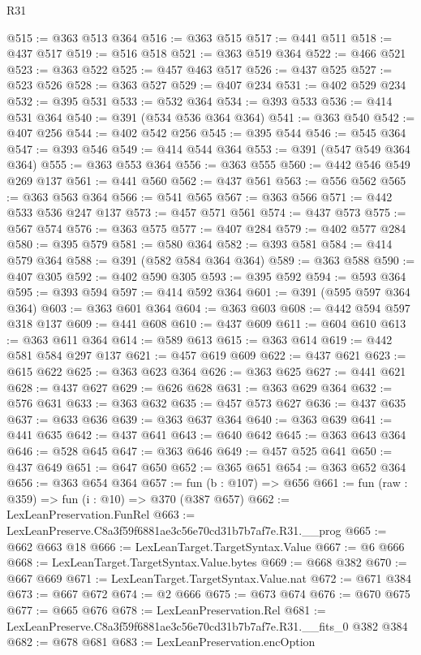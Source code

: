 \begin{lexlean}{R31}
\begin{coremodule}
@515 := @363 @513 @364
@516 := @363 @515
@517 := @441 @511
@518 := @437 @517
@519 := @516 @518
@521 := @363 @519 @364
@522 := @466 @521
@523 := @363 @522
@525 := @457 @463 @517
@526 := @437 @525
@527 := @523 @526
@528 := @363 @527
@529 := @407 @234
@531 := @402 @529 @234
@532 := @395 @531
@533 := @532 @364
@534 := @393 @533
@536 := @414 @531 @364
@540 := @391 (@534 @536 @364 @364)
@541 := @363 @540
@542 := @407 @256
@544 := @402 @542 @256
@545 := @395 @544
@546 := @545 @364
@547 := @393 @546
@549 := @414 @544 @364
@553 := @391 (@547 @549 @364 @364)
@555 := @363 @553 @364
@556 := @363 @555
@560 := @442 @546 @549 @269 @137
@561 := @441 @560
@562 := @437 @561
@563 := @556 @562
@565 := @363 @563 @364
@566 := @541 @565
@567 := @363 @566
@571 := @442 @533 @536 @247 @137
@573 := @457 @571 @561
@574 := @437 @573
@575 := @567 @574
@576 := @363 @575
@577 := @407 @284
@579 := @402 @577 @284
@580 := @395 @579
@581 := @580 @364
@582 := @393 @581
@584 := @414 @579 @364
@588 := @391 (@582 @584 @364 @364)
@589 := @363 @588
@590 := @407 @305
@592 := @402 @590 @305
@593 := @395 @592
@594 := @593 @364
@595 := @393 @594
@597 := @414 @592 @364
@601 := @391 (@595 @597 @364 @364)
@603 := @363 @601 @364
@604 := @363 @603
@608 := @442 @594 @597 @318 @137
@609 := @441 @608
@610 := @437 @609
@611 := @604 @610
@613 := @363 @611 @364
@614 := @589 @613
@615 := @363 @614
@619 := @442 @581 @584 @297 @137
@621 := @457 @619 @609
@622 := @437 @621
@623 := @615 @622
@625 := @363 @623 @364
@626 := @363 @625
@627 := @441 @621
@628 := @437 @627
@629 := @626 @628
@631 := @363 @629 @364
@632 := @576 @631
@633 := @363 @632
@635 := @457 @573 @627
@636 := @437 @635
@637 := @633 @636
@639 := @363 @637 @364
@640 := @363 @639
@641 := @441 @635
@642 := @437 @641
@643 := @640 @642
@645 := @363 @643 @364
@646 := @528 @645
@647 := @363 @646
@649 := @457 @525 @641
@650 := @437 @649
@651 := @647 @650
@652 := @365 @651
@654 := @363 @652 @364
@656 := @363 @654 @364
@657 := fun (b : @107) => @656
@661 := fun (raw : @359) => fun (i : @10) => @370 (@387 @657)
@662 := LexLeanPreservation.FunRel
@663 := LexLeanPreserve.C8a3f59f6881ae3c56e70cd31b7b7af7e.R31.__prog
@665 := @662 @663 @18
@666 := LexLeanTarget.TargetSyntax.Value
@667 := @6 @666
@668 := LexLeanTarget.TargetSyntax.Value.bytes
@669 := @668 @382
@670 := @667 @669
@671 := LexLeanTarget.TargetSyntax.Value.nat
@672 := @671 @384
@673 := @667 @672
@674 := @2 @666
@675 := @673 @674
@676 := @670 @675
@677 := @665 @676
@678 := LexLeanPreservation.Rel
@681 := LexLeanPreserve.C8a3f59f6881ae3c56e70cd31b7b7af7e.R31.__fits_0 @382 @384
@682 := @678 @681
@683 := LexLeanPreservation.encOption

\end{coremodule}
\end{lexlean}
